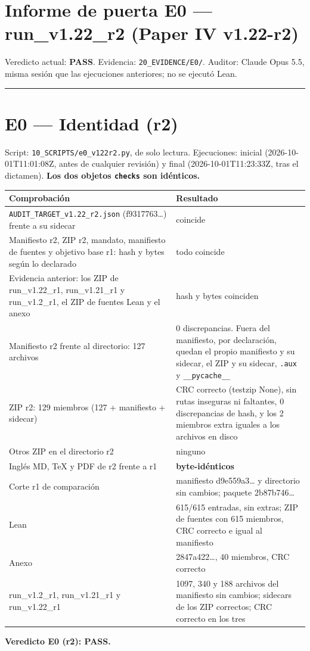 \documentclass[
]{article}
\author{}
\date{}
\newcounter{none} %
\begin{document}
\section{Informe de puerta E0 --- run\_v1.22\_r2 (Paper IV
v1.22-r2)}\label{informe-de-puerta-e0--run_v122_r2-paper-iv-v122-r2}

Veredicto actual: \textbf{PASS}. Evidencia: \texttt{20\_EVIDENCE/E0/}.
Auditor: Claude Opus 5.5, misma sesión que las ejecuciones anteriores;
no se ejecutó Lean.

\begin{center}\rule{0.5\linewidth}{0.5pt}\end{center}

\section{E0 --- Identidad (r2)}\label{e0--identidad-r2}

Script: \texttt{10\_SCRIPTS/e0\_v122r2.py}, de solo lectura.
Ejecuciones: inicial (2026-10-01T11:01:08Z, antes de cualquier revisión)
y final (2026-10-01T11:23:33Z, tras el dictamen). \textbf{Los dos
objetos \texttt{checks} son idénticos.}

{\def\LTcaptype{none} %
\begin{longtable}[]{@{}ll@{}}
\toprule\noalign{}
Comprobación & Resultado \\
\midrule\noalign{}
\endhead
\bottomrule\noalign{}
\endlastfoot
\texttt{AUDIT\_TARGET\_v1.22\_r2.json} (f9317763\ldots) frente a su
sidecar & coincide \\
Manifiesto r2, ZIP r2, mandato, manifiesto de fuentes y objetivo base
r1: hash y bytes según lo declarado & todo coincide \\
Evidencia anterior: los ZIP de run\_v1.22\_r1, run\_v1.21\_r1 y
run\_v1.2\_r1, el ZIP de fuentes Lean y el anexo & hash y bytes
coinciden \\
Manifiesto r2 frente al directorio: 127 archivos & 0 discrepancias.
Fuera del manifiesto, por declaración, quedan el propio manifiesto y su
sidecar, el ZIP y su sidecar, \texttt{.aux} y
\texttt{\_\_pycache\_\_} \\
ZIP r2: 129 miembros (127 + manifiesto + sidecar) & CRC correcto
(testzip None), sin rutas inseguras ni faltantes, 0 discrepancias de
hash, y los 2 miembros extra iguales a los archivos en disco \\
Otros ZIP en el directorio r2 & ninguno \\
Inglés MD, TeX y PDF de r2 frente a r1 & \textbf{byte-idénticos} \\
Corte r1 de comparación & manifiesto d9e559a3\ldots{} y directorio sin
cambios; paquete 2b87b746\ldots{} \\
Lean & 615/615 entradas, sin extras; ZIP de fuentes con 615 miembros,
CRC correcto e igual al manifiesto \\
Anexo & 2847a422\ldots, 40 miembros, CRC correcto \\
run\_v1.2\_r1, run\_v1.21\_r1 y run\_v1.22\_r1 & 1097, 340 y 188
archivos del manifiesto sin cambios; sidecars de los ZIP correctos; CRC
correcto en los tres \\
\end{longtable}
}

\textbf{Veredicto E0 (r2): PASS.}
\end{document}
